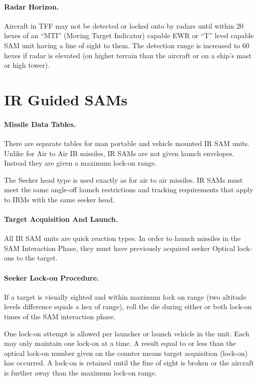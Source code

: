 \paragraph{Radar Horizon.} Aircraft in TFF may not be detected or locked onto by radars until within 20 hexes of an “MTI” (Moving Target Indicator) capable EWR or “T” level capable SAM unit having a line of sight to them. The detection range is increased to 60 hexes if radar is elevated (on higher terrain than the aircraft or on a ship’s mast or high tower).

\section{IR Guided SAMs}

\paragraph{Missile Data Tables.} There are separate tables for man portable and vehicle mounted IR SAM units. Unlike for Air to Air IR missiles, IR SAMs are not given launch envelopes. Instead they are given a maximum lock-on range.

The Seeker head type is used exactly as for air to air missiles. IR SAMs must meet the same angle-off launch restrictions and tracking requirements that apply to IRMs with the same seeker head.

\paragraph{Target Acquisition And Launch.} All IR SAM units are quick reaction types. In order to launch missiles in the SAM Interaction Phase, they must have previously acquired seeker Optical lock-ons to the target.

\paragraph{Seeker Lock-on Procedure.} 

If a target is visually sighted and within maximum lock on range (two altitude levels difference equals a hex of range), roll the die during either or both lock-on times of the SAM interaction phase.

One lock-on attempt is allowed per launcher or launch vehicle in the unit. Each may only maintain one lock-on at a time. A result equal to or less than the optical lock-on number given on the counter means target acquisition (lock-on) has occurred. A lock-on is retained until the fine of sight is broken or the aircraft is further away than the maximum lock-on range.


